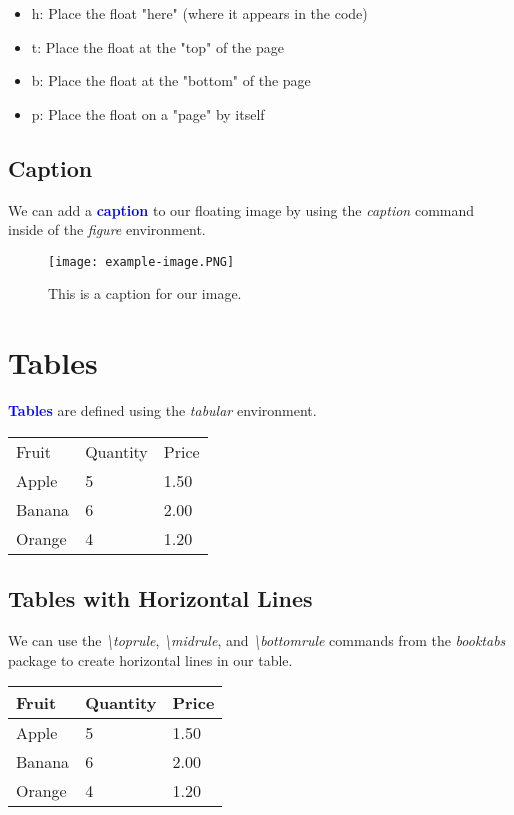 \documentclass{article}
\newcommand{\kw}[1]{\textcolor{blue}{\textbf{#1}}}
\newcommand{\cmd}[1]{\textit{#1}}
\begin{document}
\begin{itemize}
  \item h: Place the float "here" (where it appears in the code)
  \item t: Place the float at the "top" of the page
  \item b: Place the float at the "bottom" of the page
  \item p: Place the float on a "page" by itself
\end{itemize}

\subsection{Caption}

We can add a \kw{caption} to our floating image by using the \cmd{caption} command inside of the
\cmd{figure} environment.

\begin{figure}[ht]
  \centering
  \texttt{[image: example-image.PNG]}
  \caption{This is a caption for our image.}
\end{figure}

\section{Tables}

\kw{Tables} are defined using the \cmd{tabular} environment.

\begin{tabular}{*{3}{l}}
  Fruit  & Quantity & Price \\
  Apple  & 5        & 1.50  \\
  Banana & 6        & 2.00  \\
  Orange & 4        & 1.20  \\
\end{tabular}

\subsection{Tables with Horizontal Lines}

We can use the \cmd{\textbackslash toprule}, \cmd{\textbackslash midrule}, and
\cmd{\textbackslash bottomrule} commands from the \cmd{booktabs} package to create horizontal
lines in our table.

\begin{tabular}{*{3}{l}}
  \toprule
  Fruit  & Quantity & Price \\
  \midrule
  Apple  & 5        & 1.50  \\
  Banana & 6        & 2.00  \\
  Orange & 4        & 1.20  \\
  \bottomrule
\end{tabular}
\end{document}
